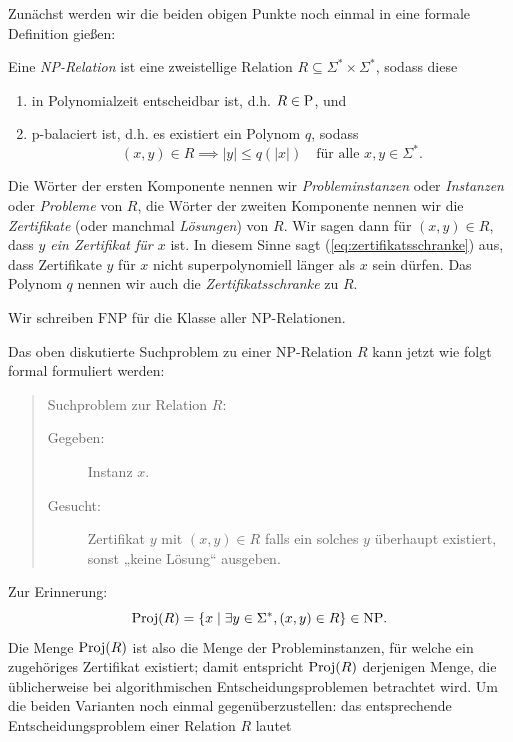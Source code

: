 Zunächst werden wir die beiden obigen Punkte noch einmal in eine formale Definition gießen:
\begin{definition}
    Eine \emph{NP-Relation} ist eine zweistellige Relation $R\subseteq \Sigma^*\times\Sigma^*$, sodass diese
    \begin{enumerate}
        \item in Polynomialzeit entscheidbar ist, d.h. $R\in\P$, und
        \item p-balaciert ist, d.h. es existiert ein Polynom $q$, sodass
            \begin{equation}\label{eq:zertifikatsschranke}
                (x,y)\in R \implies |y|\leq q(|x|) \quad\text{für alle $x,y\in\Sigma^*$}.
            \end{equation}
    \end{enumerate}
    Die Wörter der ersten Komponente nennen wir \emph{Probleminstanzen} oder \emph{Instanzen} oder \emph{Probleme} von $R$, die Wörter der zweiten Komponente nennen wir die \emph{Zertifikate} (oder manchmal \emph{Lösungen}) von $R$. Wir sagen dann für $(x,y)\in R$, dass \emph{$y$ ein Zertifikat für $x$} ist. In diesem Sinne sagt (\ref{eq:zertifikatsschranke})  aus, dass Zertifikate $y$ für $x$ nicht superpolynomiell länger als $x$ sein dürfen.
    Das Polynom $q$ nennen wir auch die \emph{Zertifikatsschranke} zu $R$. 

    Wir schreiben $\mathrm{FNP}$ für die Klasse aller NP-Relationen. \qedhere
\end{definition}
Das oben diskutierte Suchproblem zu einer NP-Relation $R$ kann jetzt wie folgt formal formuliert werden:
\begin{quote}
    Suchproblem zur Relation $R$:
    \begin{description}
        \item[Gegeben:] Instanz $x$.
        \item[Gesucht:] Zertifikat $y$ mit $(x,y)\in  R$ falls ein solches $y$ überhaupt existiert, sonst „keine Lösung“ ausgeben.
    \end{description}
\end{quote}
Zur Erinnerung:
\[ \Proj(R) = \{ x \mid \exists y\in\Sigma^*, (x,y)\in R \}\in\NP. \]
Die Menge $\Proj(R)$ ist also die Menge der Probleminstanzen, für welche ein zugehöriges Zertifikat existiert; damit entspricht $\Proj(R)$ derjenigen Menge, die üblicherweise bei algorithmischen Entscheidungsproblemen betrachtet wird. 
Um die beiden Varianten noch einmal gegenüberzustellen: das entsprechende Entscheidungsproblem einer Relation $R$ lautet

